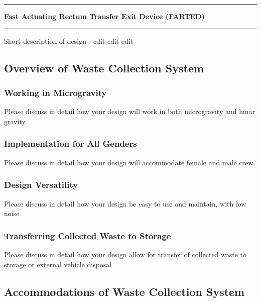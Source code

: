 \pagebreak
\chapter[Fast Actuating Rectum Transfer Exit Device (FARTED)]{}\vspace{-2cm}\noindent\rule{\textwidth}{2.5pt}
\thispagestyle{empty}

\vspace{5cm}\textbf{\huge{Fast Actuating Rectum Transfer Exit Device (FARTED)}}

\medskip\noindent\rule{\textwidth}{1pt}

Short description of design - edit edit edit

\pagebreak
{}
\section[Overview of Design]{Overview of Waste Collection System}

    \subsection{Working in Microgravity}
    Please discuss in detail how your design will work in both microgravity and lunar gravity

    \subsection{Implementation for All Genders}
    Please discuss in detail how your design will accommodate female and male crew

    \subsection{Design Versatility}
    Please discuss in detail how your design be easy to use and maintain, with low noise

    \subsection{Transferring Collected Waste to Storage}
    Please discuss in detail how your design allow for transfer of collected waste to storage or external vehicle disposal

\pagebreak
\section[Accommodations]{Accommodations of Waste Collection System}

